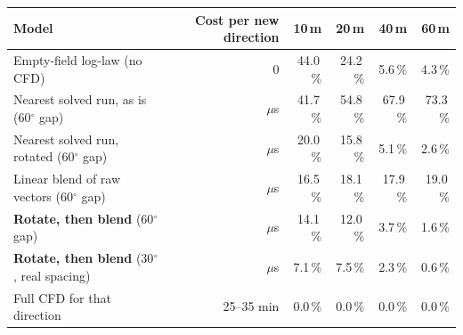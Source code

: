 \begin{tabular}{@{}lrrrrr@{}}
\toprule
Model & Cost per new direction & 10\,m & 20\,m & 40\,m & 60\,m \\
\midrule
Empty-field log-law (no CFD) & 0 & 44.0\,\% & 24.2\,\% & 5.6\,\% & 4.3\,\% \\
Nearest solved run, as is (60$^\circ$ gap) & $\mu$s & 41.7\,\% & 54.8\,\% & 67.9\,\% & 73.3\,\% \\
Nearest solved run, rotated (60$^\circ$ gap) & $\mu$s & 20.0\,\% & 15.8\,\% & 5.1\,\% & 2.6\,\% \\
Linear blend of raw vectors (60$^\circ$ gap) & $\mu$s & 16.5\,\% & 18.1\,\% & 17.9\,\% & 19.0\,\% \\
\textbf{Rotate, then blend} (60$^\circ$ gap) & $\mu$s & 14.1\,\% & 12.0\,\% & 3.7\,\% & 1.6\,\% \\
\textbf{Rotate, then blend} (30$^\circ$, real spacing) & $\mu$s & 7.1\,\% & 7.5\,\% & 2.3\,\% & 0.6\,\% \\
Full CFD for that direction & 25--35 min & 0.0\,\% & 0.0\,\% & 0.0\,\% & 0.0\,\% \\
\bottomrule
\end{tabular}
